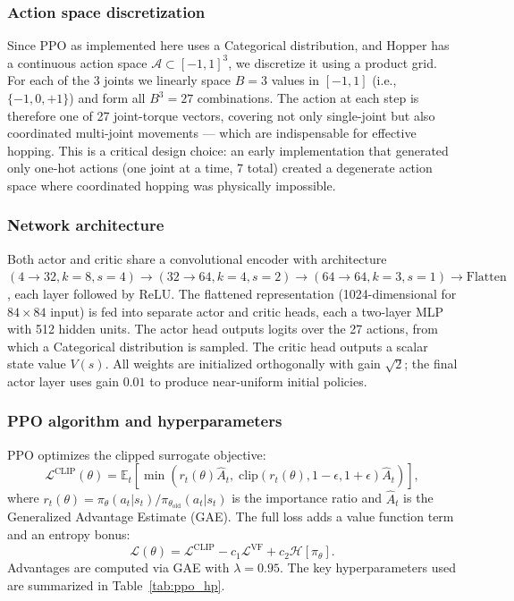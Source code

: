 \documentclass[onecolumn]{cwpreport} %
\begin{document}
\subsubsection{Action space discretization}

Since PPO as implemented here uses a Categorical distribution, and Hopper has a continuous action space $\mathcal{A} \subset [-1, 1]^3$, we discretize it using a product grid. For each of the 3 joints we linearly space $B = 3$ values in $[-1, 1]$ (i.e., $\{-1, 0, +1\}$) and form all $B^3 = 27$ combinations. The action at each step is therefore one of 27 joint-torque vectors, covering not only single-joint but also coordinated multi-joint movements — which are indispensable for effective hopping. This is a critical design choice: an early implementation that generated only one-hot actions (one joint at a time, 7 total) created a degenerate action space where coordinated hopping was physically impossible.

\subsubsection{Network architecture}

Both actor and critic share a convolutional encoder with architecture $(4 \to 32, k{=}8, s{=}4) \to (32 \to 64, k{=}4, s{=}2) \to (64 \to 64, k{=}3, s{=}1) \to \text{Flatten}$, each layer followed by ReLU. The flattened representation (1024-dimensional for $84\times84$ input) is fed into separate actor and critic heads, each a two-layer MLP with 512 hidden units. The actor head outputs logits over the 27 actions, from which a Categorical distribution is sampled. The critic head outputs a scalar state value $V(s)$. All weights are initialized orthogonally with gain $\sqrt{2}$; the final actor layer uses gain $0.01$ to produce near-uniform initial policies.

\subsubsection{PPO algorithm and hyperparameters}

PPO optimizes the clipped surrogate objective:
\begin{equation}
    \mathcal{L}^{\text{CLIP}}(\theta) = \mathbb{E}_t \left[ \min\!\left( r_t(\theta)\hat{A}_t,\; \text{clip}(r_t(\theta), 1{-}\epsilon, 1{+}\epsilon)\hat{A}_t \right) \right],
\end{equation}
where $r_t(\theta) = \pi_\theta(a_t|s_t)/\pi_{\theta_\text{old}}(a_t|s_t)$ is the importance ratio and $\hat{A}_t$ is the Generalized Advantage Estimate (GAE). The full loss adds a value function term and an entropy bonus:
\begin{equation}
    \mathcal{L}(\theta) = \mathcal{L}^{\text{CLIP}} - c_1 \mathcal{L}^{\text{VF}} + c_2 \mathcal{H}[\pi_\theta].
\end{equation}
Advantages are computed via GAE with $\lambda=0.95$. The key hyperparameters used are summarized in Table~\ref{tab:ppo_hp}.
\end{document}
